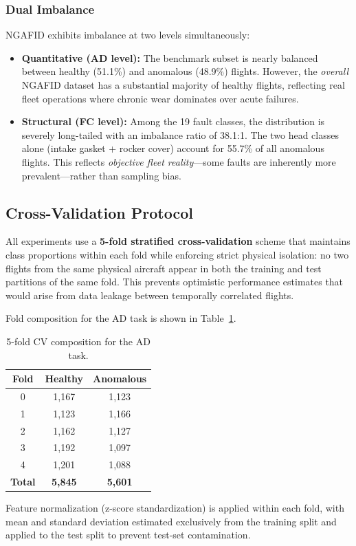 \subsubsection{Dual Imbalance}

NGAFID exhibits imbalance at two levels simultaneously:
\begin{itemize}
    \item \textbf{Quantitative (AD level):} The benchmark subset is nearly
          balanced between healthy (51.1\%) and anomalous (48.9\%) flights.
          However, the \textit{overall} NGAFID dataset has a substantial
          majority of healthy flights, reflecting real fleet operations where
          chronic wear dominates over acute failures.
    \item \textbf{Structural (FC level):} Among the 19 fault classes, the
          distribution is severely long-tailed with an imbalance ratio of 38.1:1.
          The two head classes alone (intake gasket + rocker cover) account for
          55.7\% of all anomalous flights. This reflects \textit{objective fleet
          reality}---some faults are inherently more prevalent---rather than
          sampling bias.
\end{itemize}

\subsection{Cross-Validation Protocol}
\label{subsec:cv}

All experiments use a \textbf{5-fold stratified cross-validation} scheme that
maintains class proportions within each fold while enforcing strict physical
isolation: no two flights from the same physical aircraft appear in both the
training and test partitions of the same fold. This prevents optimistic
performance estimates that would arise from data leakage between temporally
correlated flights.

Fold composition for the AD task is shown in Table~\ref{tab:cv_folds}.

\begin{table}[H]
    \centering
    \caption{5-fold CV composition for the AD task.}
    \label{tab:cv_folds}
    \begin{tabular}{ccc}
        \toprule
        \textbf{Fold} & \textbf{Healthy} & \textbf{Anomalous} \\
        \midrule
        0 & 1{,}167 & 1{,}123 \\
        1 & 1{,}123 & 1{,}166 \\
        2 & 1{,}162 & 1{,}127 \\
        3 & 1{,}192 & 1{,}097 \\
        4 & 1{,}201 & 1{,}088 \\
        \midrule
        \textbf{Total} & \textbf{5{,}845} & \textbf{5{,}601} \\
        \bottomrule
    \end{tabular}
\end{table}

Feature normalization (z-score standardization) is applied within each fold,
with mean and standard deviation estimated exclusively from the training split
and applied to the test split to prevent test-set contamination.
